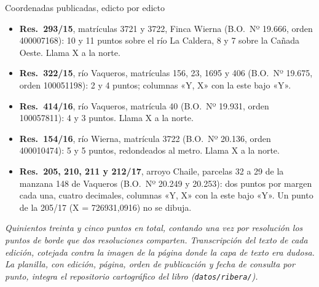 \begin{ficha}{Coordenadas publicadas, edicto por edicto}
\begin{itemize}[leftmargin=*,nosep]
\item \textbf{Res.\ 293/15}, matrículas 3721 y 3722, Finca Wierna (B.O.\ Nº 19.666, orden 400007168): 10 y 11 puntos sobre el río La Caldera, 8 y 7 sobre la Cañada Oeste. Llama X a la norte.
\item \textbf{Res.\ 322/15}, río Vaqueros, matrículas 156, 23, 1695 y 406 (B.O.\ Nº 19.675, orden 100051198): 2 y 4 puntos; columnas «Y, X» con la este bajo «Y».
\item \textbf{Res.\ 414/16}, río Vaqueros, matrícula 40 (B.O.\ Nº 19.931, orden 100057811): 4 y 3 puntos. Llama X a la norte.
\item \textbf{Res.\ 154/16}, río Wierna, matrícula 3722 (B.O.\ Nº 20.136, orden 400010474): 5 y 5 puntos, redondeados al metro. Llama X a la norte.
\item \textbf{Res.\ 205, 210, 211 y 212/17}, arroyo Chaile, parcelas 32 a 29 de la manzana 148 de Vaqueros (B.O.\ Nº 20.249 y 20.253): dos puntos por margen cada una, cuatro decimales, columnas «Y, X» con la este bajo «Y». Un punto de la 205/17 (X = 726931,0916) no se dibuja.
\end{itemize}
\textit{Quinientos treinta y cinco puntos en total, contando una vez por resolución los puntos de borde que dos resoluciones comparten. Transcripción del texto de cada edición, cotejada contra la imagen de la página donde la capa de texto era dudosa. La planilla, con edición, página, orden de publicación y fecha de consulta por punto, integra el repositorio cartográfico del libro (\texttt{datos/ribera/}).}
\end{ficha}

